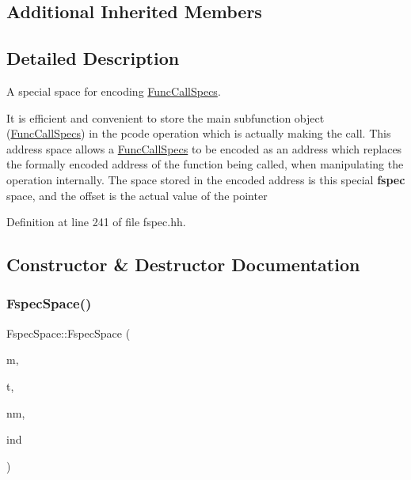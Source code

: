 \subsection*{Additional Inherited Members}


\subsection{Detailed Description}
A special space for encoding \mbox{\hyperlink{class_func_call_specs}{Func\+Call\+Specs}}. 

It is efficient and convenient to store the main subfunction object (\mbox{\hyperlink{class_func_call_specs}{Func\+Call\+Specs}}) in the pcode operation which is actually making the call. This address space allows a \mbox{\hyperlink{class_func_call_specs}{Func\+Call\+Specs}} to be encoded as an address which replaces the formally encoded address of the function being called, when manipulating the operation internally. The space stored in the encoded address is this special {\bfseries{fspec}} space, and the offset is the actual value of the pointer 

Definition at line 241 of file fspec.\+hh.



\subsection{Constructor \& Destructor Documentation}
\mbox{\label{class_fspec_space_a186ef2f65e61428b3cc12689b588cf1c}} 
\subsubsection{\texorpdfstring{FspecSpace()}{FspecSpace()}}
{\footnotesize\ttfamily Fspec\+Space\+::\+Fspec\+Space (\begin{DoxyParamCaption}\item[{\mbox{\hyperlink{class_addr_space_manager}{Addr\+Space\+Manager}} $\ast$}]{m,  }\item[{const \mbox{\hyperlink{class_translate}{Translate}} $\ast$}]{t,  }\item[{const string \&}]{nm,  }\item[{int4}]{ind }\end{DoxyParamCaption})}



